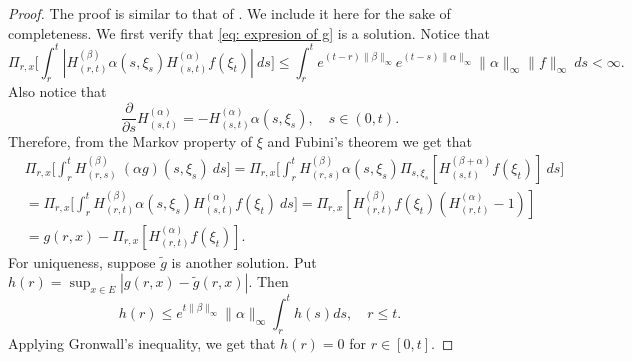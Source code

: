 \begin{proof}
    The proof is similar to that of \cite[Lemma A.1.5]{Dynkin1993Superprocesses}. We include it here for the sake of completeness.
    We first verify that \eqref{eq: expresion of g} is a solution.
    Notice that
\begin{equation}
   \Pi_{r,x} \Big[ \int_r^t | H_{(r,t)}^{(\beta)}\alpha(s,\xi_s) H_{(s,t)}^{(\alpha)} f(\xi_t)| ~ds \Big]
    \leq  \int_r^t e^{(t-r)\|\beta\|_\infty}e^{(t-s)\|\alpha\|_\infty}\|\alpha\|_\infty\|f\|_\infty ~ds
    < \infty.
\end{equation}
    Also notice that
\begin{equation}
\label{eq: crucial for Feynman-Kac}
    \frac{\partial}{\partial s} H^{(\alpha)}_{(s,t)}= -H^{(\alpha)}_{(s,t)}\alpha(s,\xi_s),
    \quad s\in (0,t).
\end{equation}
    Therefore, from the Markov property of $\xi$ and Fubini's theorem we get that
\begin{align}
    &\Pi_{r,x} \Big[ \int_r^tH_{(r,s)}^{(\beta)}~(\alpha g)(s,\xi_s)~ds \Big]
    =\Pi_{r,x} \Big[ \int_r^t H_{(r,s)}^{(\beta)}\alpha(s,\xi_s) \Pi_{s,\xi_s}[ H_{(s,t)}^{(\beta+\alpha)} f(\xi_t)]~ds \Big]
    \\&= \Pi_{r,x} \Big[ \int_r^t H_{(r,t)}^{(\beta)}\alpha(s,\xi_s) H_{(s,t)}^{(\alpha)} f(\xi_t) ~ds \Big]
    = \Pi_{r,x} [ H_{(r,t)}^{(\beta)}f(\xi_t)(H_{(r,t)}^{(\alpha)} - 1)]
    \\&= g(r,x) - \Pi_{r,x} [ H_{(r,t)}^{(\alpha)} f(\xi_t)].
\end{align}
    For uniqueness, suppose  $\tilde g$ is another solution. Put $h(r) = \sup_{x\in E}|g(r,x) - \tilde g(r,x)|$. Then
\[
   h(r) \leq e^{t\|\beta\|_\infty}\|\alpha\|_\infty \int_r^t h(s)ds,
    \quad r\le t.
\]
Applying Gronwall's inequality, we get that $h(r) =  0$ for $r\in [0,t]$.
\end{proof}



